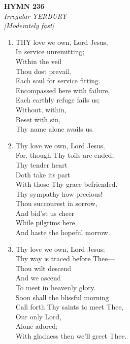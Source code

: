 \documentclass[11pt,a4paper]{article}
\begin{document}
\newpage
\begin{center}
    {\Large \textbf{HYMN 236}}
    \\
    \textit{Irregular YERBURY}
    \\
    \textit{\small [Moderately fast]}
\end{center}
\vspace{1em}

\begin{enumerate}
    \item THY love we own, Lord Jesus, \\
        In service unremitting; \\
            Within the veil \\
            Thou dost prevail, \\
        Each soul for service fitting. \\
        Encompassed here with failure, \\
        Each earthly refuge fails us; \\
            Without, within, \\
            Beset with sin, \\
        Thy name alone avails us.

    \item Thy love we own, Lord Jesus, \\
        For, though Thy toils are ended, \\
            Thy tender heart \\
            Doth take its part \\
        With those Thy grace befriended. \\
        Thy sympathy how precious! \\
        Thou succourest in sorrow, \\
            And bid'st us cheer \\
            While pilgrims here, \\
        And haste the hopeful morrow.

    \item Thy love we own, Lord Jesus; \\
        Thy way is traced before Thee--- \\
            Thou wilt descend \\
            And we ascend \\
        To meet in heavenly glory. \\
        Soon shall the blissful morning \\
        Call forth Thy saints to meet Thee, \\
            Our only Lord, \\
            Alone adored; \\
        With gladness then we'll greet Thee.


\end{enumerate}
\end{document}
